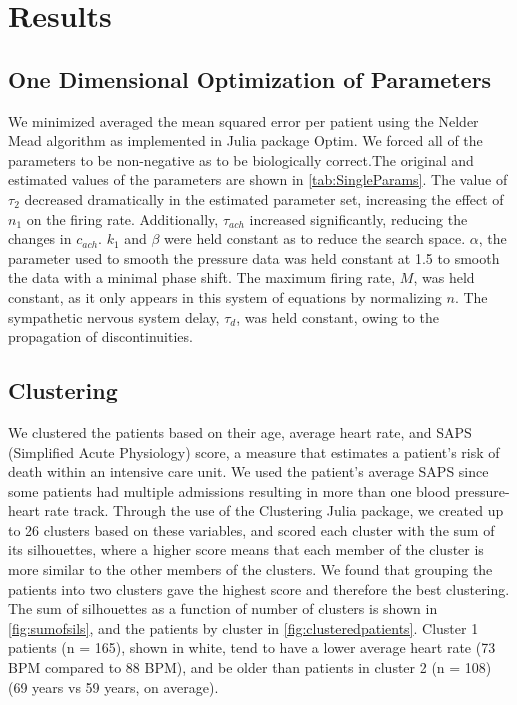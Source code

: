 \documentclass[fleqn,10pt]{wlscirep}
\begin{document}
\section*{Results}
\subsection*{One Dimensional Optimization of Parameters}
We minimized averaged the mean squared error per patient using the Nelder Mead algorithm as implemented in Julia package Optim. We forced all of the parameters to be non-negative as to be biologically correct.The original and estimated values of the parameters are shown in \ref{tab:SingleParams}. The value of $\tau_2$ decreased dramatically in the estimated parameter set, increasing the effect of $n_1$ on the firing rate. Additionally, $\tau_{ach}$ increased significantly, reducing the changes in $c_{ach}$. 
$k_1$ and $\beta$ were held constant as to reduce the search space. $\alpha$, the parameter used to smooth the pressure data was held constant at 1.5 to smooth the data with a minimal phase shift. The maximum firing rate, $M$, was held constant, as it only appears in this system of equations by normalizing $n$. The sympathetic nervous system delay, $\tau_d$, was held constant, owing to the propagation of discontinuities. \cite{baker1997pitfalls}
\subsection*{Clustering}
We clustered the patients based on their age, average heart rate, and SAPS (Simplified Acute Physiology) score, a measure that estimates a patient's risk of death within an intensive care unit.\cite{le1993new} We used the patient's average SAPS since some patients had multiple admissions resulting in more than one blood pressure-heart rate track. 
Through the use of the Clustering Julia package, we created up to 26 clusters based on these variables, and scored each cluster with the sum of its silhouettes, where a higher score means that each member of the cluster is more similar to the other members of the clusters.\cite{rousseeuw1987silhouettes} We found that grouping the patients into two clusters gave the highest score and therefore the best clustering. The sum of silhouettes as a function of number of clusters is shown in \ref{fig:sumofsils}, and the patients by cluster in \ref{fig:clusteredpatients}. Cluster 1 patients (n = 165), shown in white, tend to have a lower average heart rate (73 BPM compared to 88 BPM), and be older than patients in cluster 2 (n = 108) (69 years vs 59 years, on average). 
\end{document}
